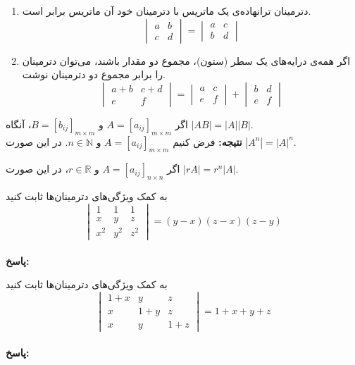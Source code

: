 \begin{enumerate}
\[	= -
	\begin{vmatrix}
		a & b \\
		c & d
	\end{vmatrix}
	\]
	\item 
	دترمینان ترانهاده‌ی یک ماتریس با دترمینان خود آن ماتریس برابر است.
	\[
	\begin{vmatrix}
		a & b \\
		c & d
	\end{vmatrix}
	=
	\begin{vmatrix}
		a & c \\
		b & d
	\end{vmatrix}
	\]
	\item 
	اگر همه‌ی درایه‌های یک سطر (ستون)، مجموع دو مقدار باشند، می‌توان دترمینان را برابر مجموع دو دترمینان نوشت.
	\[
	\begin{vmatrix}
		a+b & c+d \\
		e & f
	\end{vmatrix}
	=
	\begin{vmatrix}
		a & c \\
		e & f
	\end{vmatrix}
	+
	\begin{vmatrix}
		b & d \\
		e & f
	\end{vmatrix}
	\]
\end{enumerate}

\begin{theorem}
	اگر
	$A=[a_{ij}]_{m \times m}$ و
	$B=[b_{ij}]_{m \times m}$،
	آنگاه
	$|AB|=|A||B|$. \\
	\textbf{نتیجه:}
	فرض کنیم
	$A=[a_{ij}]_{m \times m}$
	و
	$n \in \mathbb{N}$.
	در این صورت
	$|A^n|=|A|^n$.
\end{theorem}

\begin{theorem}
	اگر
	$A=[a_{ij}]_{n \times n}$
	و
	$r \in \mathbb{R}$،
	در این صورت
	$|rA| = r^n|A|$.
\end{theorem}

\begin{example}
	به کمک ویژگی‌های دترمینان‌ها ثابت کنید
	\[
	\begin{vmatrix}
		1 & 1 & 1 \\
		x & y & z \\
		x^2 & y^2 & z^2
	\end{vmatrix}
	= (y-x)(z-x)(z-y)
	\]
	\\ \textbf{پاسخ:}
\end{example}

\begin{example}
	به کمک ویژگی‌های دترمینان‌ها ثابت کنید
	\[
	\begin{vmatrix}
		1+x & y & z \\
		x & 1+y & z \\
		x & y & 1+z
	\end{vmatrix}
	= 1+x+y+z
	\]
	\\ \textbf{پاسخ:}
\end{example}


